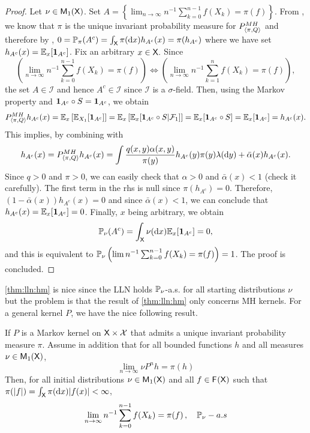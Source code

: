 \documentclass[english,graybox,envcountchap,envcountsame,sectrefs,shortlabels]{svmono}
\theoremstyle{style}
\begin{document}
\begin{proof}
Let $\nu\in\mathsf{M}_{1}(\mathsf{X})$. Set $A=\left\{ \lim_{n\to\infty}n^{-1}\sum_{k=0}^{n-1}f(X_{k})=\pi(f)\right\} $.
From , we know that $\pi$ is the unique invariant
probability measure for $P_{\langle\pi,Q\rangle}^{MH}$ and therefore by ,
$0=\mathbb{P}_{\pi}(A^{c})=\int_{\mathsf{X}}\pi(\mathrm{d} x)h_{A^{c}}(x)=\pi(h_{A^{c}})$
where we have set $h_{A^{c}}(x)=\mathbb{E}_{x}[\mathbf{1}_{A^{c}}]$. Fix an arbitrary
$x\in\mathsf{X}.$ Since
\[
\left(\lim_{n\to\infty}n^{-1}\sum_{k=0}^{n-1}f(X_{k})=\pi(f)\right)\Leftrightarrow\left(\lim_{n\to\infty}n^{-1}\sum_{k=1}^{n}f(X_{k})=\pi(f)\right),
\]
the set $A\in\mathcal{I}$ and hence $A^{c}\in\mathcal{I}$ since
$\mathcal{I}$ is a $\sigma$-field. Then, using the Markov property
and $\mathbf{1}_{A^{c}}\circ S=\mathbf{1}_{A^{c}}$, we obtain
\[
P_{\langle\pi,Q\rangle}^{MH}h_{A^{c}}(x)=\mathbb{E}_{x}\left[\mathbb{E}_{X_{1}}[\mathbf{1}_{A^{c}}]\right]=\mathbb{E}_{x}\left[\mathbb{E}_{x}[\mathbf{1}_{A^{c}}\circ S|\mathcal{F}_{1}]\right]=\mathbb{E}_{x}[\mathbf{1}_{A^{c}}\circ S]=\mathbb{E}_{x}[\mathbf{1}_{A^{c}}]=h_{A^{c}}(x).
\]
This implies, by combining with 
\[
h_{A^{c}}(x)=P_{\langle\pi,Q\rangle}^{MH}h_{A^{c}}(x)=\int\frac{q(x,y)\alpha(x,y)}{\pi(y)}h_{A^{c}}(y)\pi(y)\lambda(\mathrm{d} y)+\bar{\alpha}(x)h_{A^{c}}(x).
\]
 Since $q>0$ and $\pi>0$, we can easily check that $\alpha>0$ and
$\bar{\alpha}(x)<1$ (check it carefully). The first term in the rhs
is null since $\pi(h_{A^{c}})=0$. Therefore, $\left(1-\bar{\alpha}(x)\right)h_{A^{c}}(x)=0$
and since $\bar{\alpha}(x)<1$, we can conclude that $h_{A^{c}}(x)=\mathbb{E}_{x}[\mathbf{1}_{A^{c}}]=0$.
Finally, $x$ being arbitrary, we obtain
\[
\mathbb{P}_{\nu}(A^{c})=\int_{\mathsf{X}}\nu(\mathrm{d} x)\mathbb{E}_{x}[\mathbf{1}_{A^{c}}]=0,
\]
 and this is equivalent to $\mathbb{P}_{\nu}\left(\lim n^{-1}\sum_{k=0}^{n-1}f(X_{k})=\pi(f)\right)=1$. The
proof is concluded.
\end{proof}

\autoref{thm:lln:hm} is nice since the LLN holds $\mathbb{P}_\nu$-a.s. for all starting distributions $\nu$ but the problem is that the result of \autoref{thm:lln:hm} only concerns MH kernels. For a general kernel $P$, we have the nice following result.


\begin{theorem}
If $P$ is a Markov kernel on $\mathsf{X} \times\mathcal{X}$ that admits a unique invariant probability measure $\pi$. Assume in addition that for all bounded functions $h$ and all measures $\nu\in\mathsf{M}_{1}(\mathsf{X})$,
\begin{equation}
\label{eq:setwise}
\lim_{n \to \infty}  \nu P^n h=\pi(h)
\end{equation}
Then, for all initial
distributions $\nu\in\mathsf{M}_{1}(\mathsf{X})$ and all $f\in\mathsf{F_{}}(\mathsf{X})$
such that $\pi(|f|)=\int_{\mathsf{X}}\pi(\mathrm{d} x)|f(x)|<\infty$,
\begin{equation}
\lim_{n\to\infty}n^{-1}\sum_{k=0}^{n-1}f(X_{k})=\pi(f)\,,\quad\mathbb{P}_{\nu}-a.s\label{eq:LLN:gener}
\end{equation}
\end{theorem}
\end{document}
